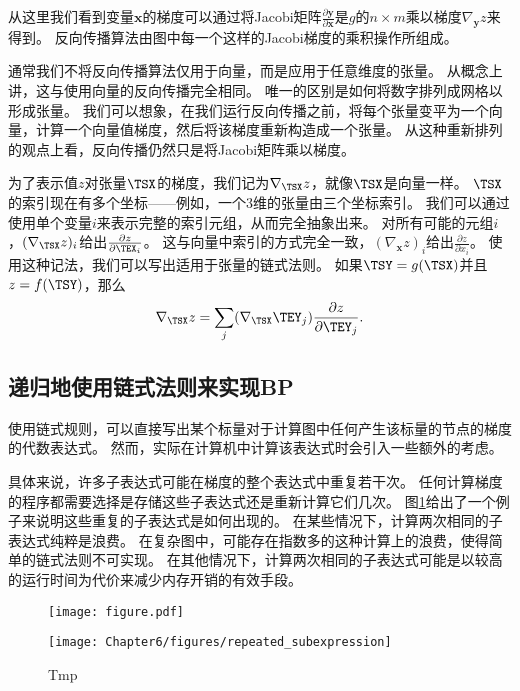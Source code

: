 从这里我们看到变量$\bm{x}$的梯度可以通过将Jacobi矩阵$\frac{\partial \bm{y}}{\partial \bm{x}}$是$g$的$n\times m$乘以梯度$\nabla_{\bm{y}} z$来得到。
反向传播算法由图中每一个这样的Jacobi梯度的乘积操作所组成。


通常我们不将反向传播算法仅用于向量，而是应用于任意维度的张量。
从概念上讲，这与使用向量的反向传播完全相同。 
唯一的区别是如何将数字排列成网格以形成张量。 
我们可以想象，在我们运行反向传播之前，将每个张量变平为一个向量，计算一个向量值梯度，然后将该梯度重新构造成一个张量。
从这种重新排列的观点上看，反向传播仍然只是将Jacobi矩阵乘以梯度。


为了表示值$z$对张量$\TSX$的梯度，我们记为$\nabla_\TSX z$，就像$\TSX$是向量一样。
$\TSX$的索引现在有多个坐标——例如，一个3维的张量由三个坐标索引。
我们可以通过使用单个变量$i$来表示完整的索引元组，从而完全抽象出来。
对所有可能的元组$i$，$(\nabla_\TSX z)_i$给出$\frac{\partial z}{\partial \TEX_i}$。
这与向量中索引的方式完全一致，$(\nabla_{\bm{x}} z)_i$给出$\frac{\partial z}{\partial x_i}$。
使用这种记法，我们可以写出适用于张量的链式法则。
如果$\TSY=g(\TSX)$并且$z=f(\TSY)$，那么
\begin{equation}
  \nabla_\TSX z = \sum_j (\nabla_\TSX \TEY_j)\frac{\partial z}{\partial \TEY_j}.
  \label{eq:6.47}
\end{equation}

\subsection{递归地使用链式法则来实现BP}
\label{sec:recursively_applying_the_chain_rule_to_obtain_backprop}

使用链式规则，可以直接写出某个标量对于计算图中任何产生该标量的节点的梯度的代数表达式。
然而，实际在计算机中计算该表达式时会引入一些额外的考虑。

具体来说，许多子表达式可能在梯度的整个表达式中重复若干次。
任何计算梯度的程序都需要选择是存储这些子表达式还是重新计算它们几次。
图\ref{fig:chap6_repeated_subexpression}给出了一个例子来说明这些重复的子表达式是如何出现的。
在某些情况下，计算两次相同的子表达式纯粹是浪费。
在复杂图中，可能存在指数多的这种计算上的浪费，使得简单的链式法则不可实现。
在其他情况下，计算两次相同的子表达式可能是以较高的运行时间为代价来减少内存开销的有效手段。
\begin{figure}[!htb]
\ifOpenSource
\centerline{\texttt{[image: figure.pdf]}}
\else
\centerline{\texttt{[image: Chapter6/figures/repeated\_subexpression]}}
\fi
\caption{Tmp}
\label{fig:chap6_repeated_subexpression}
\end{figure}

